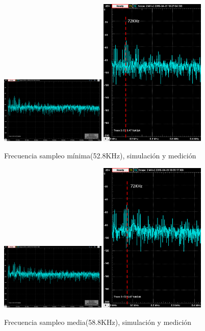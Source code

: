 \documentclass[../../ASSD_TP1_G7.tex]{subfiles}
\begin{document}
\begin{figure}[H]
\centering
{}
{\includegraphics[width=0.45\textwidth]{figures/simpto_8_llave_52,8khz_espectro.png}}
{\includegraphics[width=0.45\textwidth]{figures/pto_8_llave_52,8khz_espectro.png}}
\caption{Frecuencia sampleo mínima(52.8KHz), simulación y medición}
\end{figure}

\begin{figure}[H]
\centering
{}
{\includegraphics[width=0.45\textwidth]{figures/simpto_8_llave_58,8_espectro.png}}
{\includegraphics[width=0.45\textwidth]{figures/pto_8_llave_58,8_espectro.png}}
\caption{Frecuencia sampleo media(58.8KHz), simulación y medición}
\end{figure}
\end{document}
